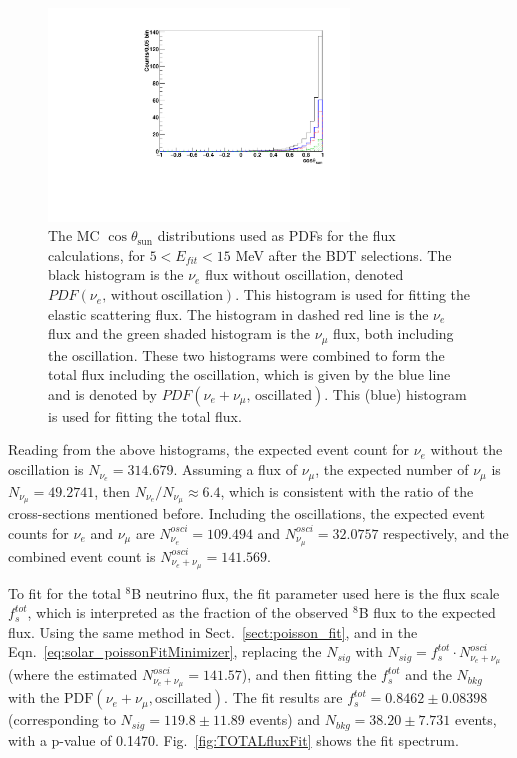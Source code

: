 \begin{figure}[!htb]
	\centering
	\includegraphics[width=8cm]{MCfluxPdfs.pdf}
	\caption[The MC $\cos\theta_\mathrm{sun}$ distributions used as PDFs for the flux calculations, for $5<E_{fit}<15$ MeV after the BDT selections.]{The MC $\cos\theta_\mathrm{sun}$ distributions used as PDFs for the flux calculations, for $5<E_{fit}<15$ MeV after the BDT selections. The black histogram is the $\nu_e$ flux without oscillation, denoted $PDF(\nu_e, \, \mathrm{without~oscillation})$. This histogram is used for fitting the elastic scattering flux. The histogram in dashed red line is the $\nu_e$ flux and the green shaded histogram is the $\nu_\mu$ flux, both including the oscillation. These two histograms were combined to form the total flux including the oscillation, which is given by the blue line and is denoted by $PDF(\nu_e+\nu_\mu, \, \mathrm{oscillated})$. This (blue) histogram is used for fitting the total flux.\label{fig:MCfluxPdfs}}
\end{figure} 

Reading from the above histograms, the expected event count for $\nu_e$ without the oscillation is $N_{\nu_e} = 314.679$. Assuming a flux of $\nu_\mu$, the expected number of $\nu_\mu$ is $N_{\nu_\mu}=49.2741$, then $N_{\nu_e}/N_{\nu_\mu}\approx 6.4$, which is consistent with the ratio of the cross-sections mentioned before. Including the oscillations, the expected event counts for $\nu_e$ and $\nu_\mu$ are $N^{osci}_{\nu_e} = 109.494$ and $N^{osci}_{\nu_\mu} = 32.0757$ respectively, and the combined event count is $N^{osci}_{\nu_e+\nu_\mu}=141.569$. %
 
To fit for the total $^8$B neutrino flux, the fit parameter used here is the flux scale $f^{tot}_s$, which is interpreted as the fraction of the observed $^8$B flux to the expected flux. Using the same method in Sect.~\ref{sect:poisson_fit}, and in the Eqn.~\ref{eq:solar_poissonFitMinimizer}, replacing the $N_{sig}$ with $N_{sig}=f^{tot}_s\cdot N^{osci}_{\nu_e+\nu_\mu}$(where the estimated $N^{osci}_{\nu_e+\nu_\mu}=141.57$), and then fitting the $f^{tot}_s$ and the $N_{bkg}$ with the $\mathrm{PDF}(\nu_e+\nu_\mu,\mathrm{oscillated})$. The fit results are $f^{tot}_s=0.8462\pm 0.08398$ (corresponding to $N_{sig}=119.8\pm11.89$ events) and $N_{bkg}=38.20\pm7.731$ events, with a p-value of 0.1470. Fig.~\ref{fig:TOTALfluxFit} shows the fit spectrum.

